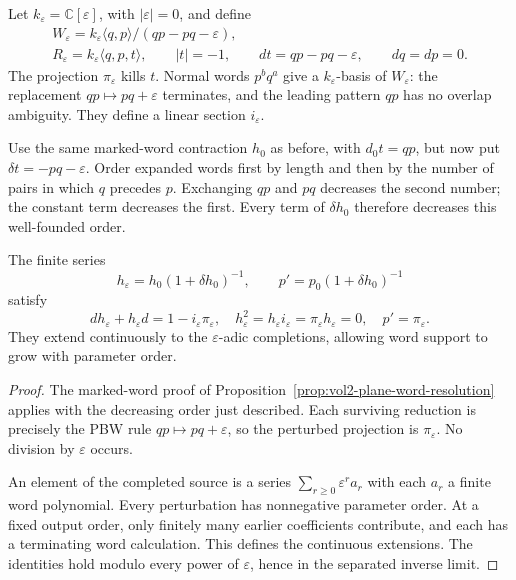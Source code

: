 Let $k_\varepsilon=\mathbb C[\varepsilon]$, with
$|\varepsilon|=0$, and define
\begin{equation}\label{eq:vol2-quantum-plane-resolution}
 \begin{gathered}
 W_\varepsilon=k_\varepsilon\langle q,p\rangle/
                              (qp-pq-\varepsilon),\\
 R_\varepsilon=k_\varepsilon\langle q,p,t\rangle,
 \qquad |t|=-1,\qquad dt=qp-pq-\varepsilon,
 \qquad dq=dp=0.
 \end{gathered}
\end{equation}
The projection $\pi_\varepsilon$ kills $t$.
Normal words $p^bq^a$ give a $k_\varepsilon$-basis of
$W_\varepsilon$: the replacement $qp\mapsto pq+\varepsilon$
terminates, and the leading pattern $qp$ has no overlap
ambiguity. They define a linear section $i_\varepsilon$.

Use the same marked-word contraction $h_0$ as before, with
$d_0t=qp$, but now put $\delta t=-pq-\varepsilon$.
Order expanded words first by length and then by the number
of pairs in which $q$ precedes $p$. Exchanging $qp$ and $pq$
decreases the second number; the constant term decreases the
first. Every term of $\delta h_0$ therefore decreases this
well-founded order.

\begin{proposition}\label{prop:vol2-integral-weyl-resolution}
The finite series
\[
 h_\varepsilon=h_0(1+\delta h_0)^{-1},\qquad
 p'=p_0(1+\delta h_0)^{-1}
\]
satisfy
\[
 dh_\varepsilon+h_\varepsilon d=1-i_\varepsilon\pi_\varepsilon,
 \quad h_\varepsilon^2=h_\varepsilon i_\varepsilon
                      =\pi_\varepsilon h_\varepsilon=0,
 \quad p'=\pi_\varepsilon.
\]
They extend continuously to the $\varepsilon$-adic completions,
allowing word support to grow with parameter order.
\end{proposition}
\begin{proof}
The marked-word proof of
Proposition~\ref{prop:vol2-plane-word-resolution} applies with
the decreasing order just described. Each surviving reduction
is precisely the PBW rule $qp\mapsto pq+\varepsilon$, so the
perturbed projection is $\pi_\varepsilon$. No division by
$\varepsilon$ occurs.

An element of the completed source is a series
$\sum_{r\geq0}\varepsilon^r a_r$ with each $a_r$ a finite
word polynomial. Every perturbation has nonnegative parameter
order. At a fixed output order, only finitely many earlier
coefficients contribute, and each has a terminating word
calculation. This defines the continuous extensions. The
identities hold modulo every power of $\varepsilon$, hence in
the separated inverse limit.
\end{proof}

